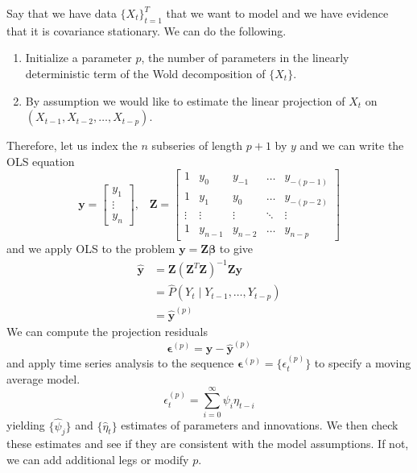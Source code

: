 \documentclass{article}
\begin{document}
    \begin{example}
      Say that we have data $\{X_t\}_{t=1}^T$ that we want to model and we have evidence that it is covariance stationary. We can do the following. 
      \begin{enumerate}
        \item Initialize a parameter $p$, the number of parameters in the linearly deterministic term of the Wold decomposition of $\{X_t\}$. 
        \item By assumption we would like to estimate the linear projection of $X_t$ on $(X_{t-1}, X_{t-2}, \ldots, X_{t-p})$. 
      \end{enumerate}
      Therefore, let us index the $n$ subseries of length $p+1$ by $y$ and we can write the OLS equation 
      \begin{equation}
        \mathbf{y} = \begin{bmatrix} y_1 \\ \vdots \\ y_n \end{bmatrix}, \;\;\; \mathbf{Z} = \begin{bmatrix} 
          1 & y_0 & y_{-1} & \ldots & y_{-(p-1)} \\
          1 & y_1 & y_{0} & \ldots & y_{-(p-2)} \\
          \vdots & \vdots & \vdots & \ddots & \vdots \\ 
          1 & y_{n-1} & y_{n-2} & \ldots & y_{n-p}
        \end{bmatrix}
      \end{equation}
      and we apply OLS to the problem $\mathbf{y} = \mathbf{Z} \boldsymbol{\beta}$ to give 
      \begin{align}
        \hat{\mathbf{y}} & = \mathbf{Z} (\mathbf{Z}^T \mathbf{Z})^{-1} \mathbf{Z} \mathbf{y} \\
                         & = \hat{P}(Y_t \mid Y_{t-1}, \ldots, Y_{t-p}) \\
                         & = \hat{\mathbf{y}}^{(p)}
      \end{align}
      We can compute the projection residuals 
      \begin{equation}
        \boldsymbol{\epsilon}^{(p)} = \mathbf{y} - \hat{\mathbf{y}}^{(p)}
      \end{equation}
      and apply time series analysis to the sequence $\boldsymbol{\epsilon}^{(p)} = \{ \epsilon^{(p)}_t \}$ to specify a moving average model. 
      \begin{equation}
        \epsilon^{(p)}_t = \sum_{i=0}^\infty \psi_i \eta_{t-i}
      \end{equation}
      yielding $\{\hat{\psi}_j\}$ and $\{\hat{\eta}_t \}$ estimates of parameters and innovations. We then check these estimates and see if they are consistent with the model assumptions. If not, we can add additional legs or modify $p$. 
    \end{example}
\end{document}
